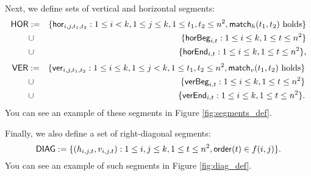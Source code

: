 Next, we define sets of vertical and horizontal segments:
\begin{eqnarray*}
\mathsf{HOR} &:= &\{\mathsf{hor}_{i,j,t_1,t_2} : 1 \le i < k, 1 \le j \le k,
1 \le t_1, t_2 \le n^2, \mathsf{match}_h(t_1, t_2) \text{ holds}\} \\
&\cup &\{\mathsf{horBeg}_{i,t} : 1 \le i \le k, 1 \le t \le n^2\}
\\
&\cup &\{\mathsf{horEnd}_{i,t} : 1 \le i \le k, 1 \le t \le n^2\},
\end{eqnarray*}
\begin{eqnarray*}
\mathsf{VER} &:= &\{\mathsf{ver}_{i,j,t_1,t_2} : 1 \le i \le k, 1 \le j < k,
1 \le t_1, t_2 \le n^2, \mathsf{match}_v(t_1, t_2) \text{ holds}\} \\
&\cup &\{\mathsf{verBeg}_{i,t} : 1 \le i \le k, 1 \le t \le n^2\}
\\
&\cup &\{\mathsf{verEnd}_{i,t} : 1 \le i \le k, 1 \le t \le n^2\}.
\end{eqnarray*}
You can see an example of these segments in Figure \ref{fig:segments_def}.

Finally, we also define a set of right-diagonal segments:
$$\mathsf{DIAG} := \{ (h_{i, j, t}, v_{i, j, t}) :
	1 \le i, j \le k, 1 \le t \le n^2, \mathsf{order}(t) \in f(i, j)\}.$$
You can see an example of such segments in Figure \ref{fig:diag_def}.
	

